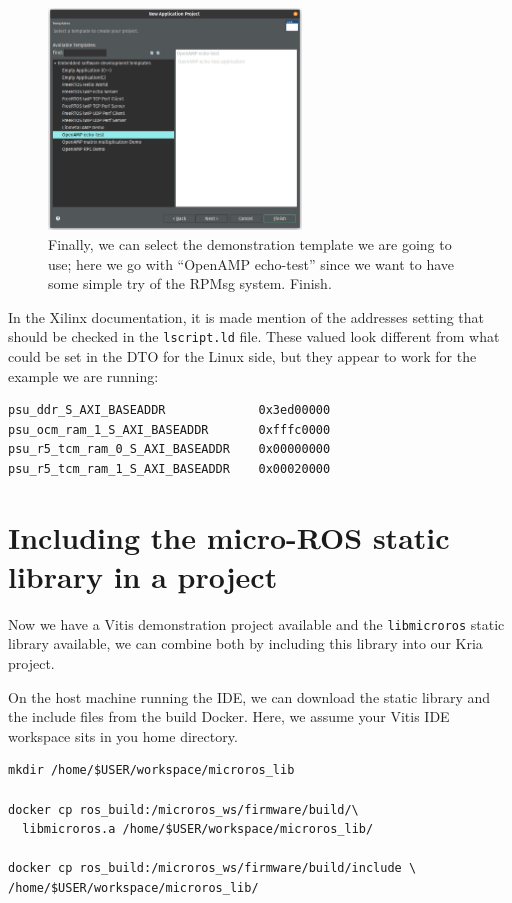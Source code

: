 \documentclass[10pt]{article}
\begin{document}
\begin{figure}[H]
  \centering
  \includegraphics[width=0.6\textwidth]{./img/vitis_new/project7}
  \caption{Finally, we can select the demonstration template we are going to use; here we go with ``OpenAMP echo-test'' since we want to
    have some simple try of the RPMsg system. Finish.}
\end{figure}


In the Xilinx documentation, it is made mention of the addresses setting that should be checked in the \verb|lscript.ld| file.
These valued look different from what could be set in the DTO for the Linux side, but they appear to
work for the example we are running:
\begin{tcolorbox}
\begin{verbatim}
psu_ddr_S_AXI_BASEADDR             0x3ed00000
psu_ocm_ram_1_S_AXI_BASEADDR       0xfffc0000
psu_r5_tcm_ram_0_S_AXI_BASEADDR    0x00000000
psu_r5_tcm_ram_1_S_AXI_BASEADDR    0x00020000
\end{verbatim}
\end{tcolorbox}


\section{Including the micro-ROS static library in a project}
Now we have a Vitis demonstration project available and the \verb|libmicroros| static library
available, we can combine both by including this library into our Kria project.

On the host machine running the IDE, we can download the static library and the include files from the build Docker.
Here, we assume your Vitis IDE workspace sits in you home directory.
\begin{tcolorbox}
\begin{verbatim}
mkdir /home/$USER/workspace/microros_lib

docker cp ros_build:/microros_ws/firmware/build/\
  libmicroros.a /home/$USER/workspace/microros_lib/

docker cp ros_build:/microros_ws/firmware/build/include \
/home/$USER/workspace/microros_lib/
\end{verbatim}
\end{tcolorbox}
\end{document}
